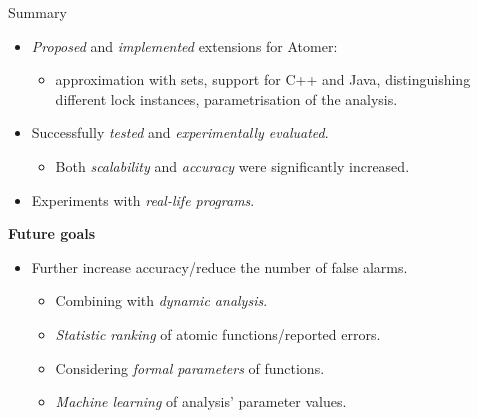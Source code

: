 \documentclass[10pt, xcolor=pdflatex, hyperref={unicode}, aspectratio=169]{beamer}
\begin{document}
\begin{frame}{Summary\footnotemark}
    \begin{itemize}\setlength\itemsep{.5em}
        \item \emph{Proposed} and \emph{implemented} \alert{extensions for Atomer}:
            \smallskip
            \begin{itemize}
                \item approximation with sets, support for C++ and Java, distinguishing different lock instances, parametrisation of the analysis.
            \end{itemize}

        \item Successfully \emph{tested} and \emph{experimentally evaluated}.
            \smallskip
            \begin{itemize}
                \item Both \emph{scalability} and \emph{accuracy} were \alert{significantly increased}.
            \end{itemize}

        \item Experiments with \emph{real-life programs}.
    \end{itemize}

    \medskip

    \textbf{Future goals}
    \smallskip
    \begin{itemize}
        \item Further increase \alert{accuracy}/reduce the number of \alert{false alarms}.
            \smallskip
            \begin{itemize}\setlength\itemsep{.5em}
                \item Combining with \emph{dynamic analysis}.

                \item \emph{Statistic ranking} of atomic functions/reported errors.

                \item Considering \emph{formal parameters} of functions.

                \item \emph{Machine learning} of analysis' parameter values.
            \end{itemize}
    \end{itemize}
    
\end{frame}
\end{document}
